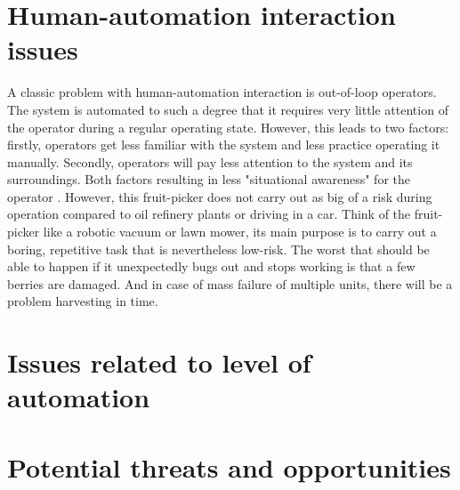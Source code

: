 \documentclass[%
oneside,    %
project,    %
nosummary   %
]{USN-MSc}
\begin{document}
\section{Human-automation interaction issues}
\label{sec:humanAutomationIssues}
A classic problem with human-automation interaction is out-of-loop operators. The system is automated to such a degree that it requires very little attention of the operator during a regular operating state. However, this leads to two factors: firstly, operators get less familiar with the system and less practice operating it manually. Secondly, operators will pay less attention to the system and its surroundings. Both factors resulting in less "situational awareness" for the operator \cite{Gruhn2011HumanMI}. However, this fruit-picker does not carry out as big of a risk during operation compared to oil refinery plants or driving in a car. Think of the fruit-picker like a robotic vacuum or lawn mower, its main purpose is to carry out a boring, repetitive task that is nevertheless low-risk. The worst that should be able to happen if it unexpectedly bugs out and stops working is that a few berries are damaged. And in case of mass failure of multiple units, there will be a problem harvesting in time. \cite{NozzleWi94:online}
\section{Issues related to level of automation}
\label{sec:issuesLevelAutomation}
\section{Potential threats and opportunities}
\label{sec:threatsOpportunities}

~\nocite{*}

\cleardoublepage

\printbibliography[heading=bibintoc, title={References}]


\end{document}
